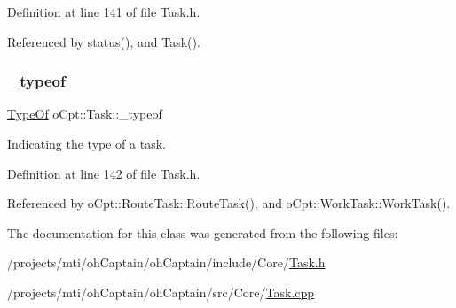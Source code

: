 Definition at line 141 of file Task.\+h.



Referenced by status(), and Task().

\hypertarget{classo_cpt_1_1_task_ac4073446fdd30a1f2296da6b6fcaf802}{}\label{classo_cpt_1_1_task_ac4073446fdd30a1f2296da6b6fcaf802} 
\subsubsection{\texorpdfstring{\+\_\+typeof}{\_typeof}}
{\footnotesize\ttfamily \hyperlink{classo_cpt_1_1i_task_a10d8726eb8957c2c305f468cf15b9f11}{Type\+Of} o\+Cpt\+::\+Task\+::\+\_\+typeof\hspace{0.3cm}{\ttfamily [protected]}}



Indicating the type of a task. 



Definition at line 142 of file Task.\+h.



Referenced by o\+Cpt\+::\+Route\+Task\+::\+Route\+Task(), and o\+Cpt\+::\+Work\+Task\+::\+Work\+Task().



The documentation for this class was generated from the following files\+:\begin{DoxyCompactItemize}
\item 
/projects/mti/oh\+Captain/oh\+Captain/include/\+Core/\hyperlink{_task_8h}{Task.\+h}\item 
/projects/mti/oh\+Captain/oh\+Captain/src/\+Core/\hyperlink{_task_8cpp}{Task.\+cpp}\end{DoxyCompactItemize}
